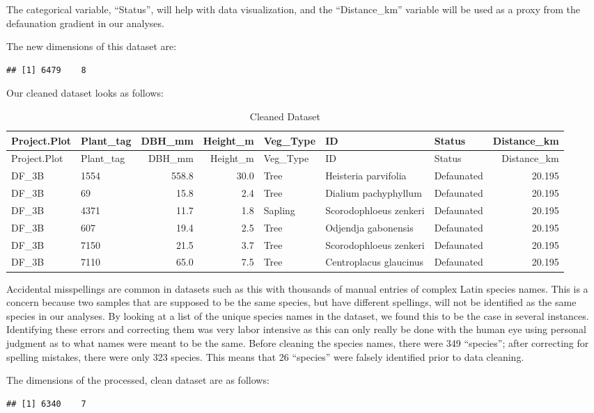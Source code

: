 \documentclass[
  12pt,
]{article}
\begin{document}
The categorical variable, ``Status'', will help with data visualization,
and the ``Distance\_km'' variable will be used as a proxy from the
defaunation gradient in our analyses.

The new dimensions of this dataset are:

\begin{verbatim}
## [1] 6479    8
\end{verbatim}

Our cleaned dataset looks as follows:

\begin{longtable}[]{@{}llrrlllr@{}}
\caption{Cleaned Dataset}\tabularnewline
\toprule
Project.Plot & Plant\_tag & DBH\_mm & Height\_m & Veg\_Type & ID &
Status & Distance\_km\tabularnewline
\midrule
\endfirsthead
\toprule
Project.Plot & Plant\_tag & DBH\_mm & Height\_m & Veg\_Type & ID &
Status & Distance\_km\tabularnewline
\midrule
\endhead
DF\_3B & 1554 & 558.8 & 30.0 & Tree & Heisteria parvifolia & Defaunated
& 20.195\tabularnewline
DF\_3B & 69 & 15.8 & 2.4 & Tree & Dialium pachyphyllum & Defaunated &
20.195\tabularnewline
DF\_3B & 4371 & 11.7 & 1.8 & Sapling & Scorodophloeus zenkeri &
Defaunated & 20.195\tabularnewline
DF\_3B & 607 & 19.4 & 2.5 & Tree & Odjendja gabonensis & Defaunated &
20.195\tabularnewline
DF\_3B & 7150 & 21.5 & 3.7 & Tree & Scorodophloeus zenkeri & Defaunated
& 20.195\tabularnewline
DF\_3B & 7110 & 65.0 & 7.5 & Tree & Centroplacus glaucinus & Defaunated
& 20.195\tabularnewline
\bottomrule
\end{longtable}

Accidental misspellings are common in datasets such as this with
thousands of manual entries of complex Latin species names. This is a
concern because two samples that are supposed to be the same species,
but have different spellings, will not be identified as the same species
in our analyses. By looking at a list of the unique species names in the
dataset, we found this to be the case in several instances. Identifying
these errors and correcting them was very labor intensive as this can
only really be done with the human eye using personal judgment as to
what names were meant to be the same. Before cleaning the species names,
there were 349 ``species''; after correcting for spelling mistakes,
there were only 323 species. This means that 26 ``species'' were falsely
identified prior to data cleaning.

The dimensions of the processed, clean dataset are as follows:

\begin{verbatim}
## [1] 6340    7
\end{verbatim}
\end{document}
